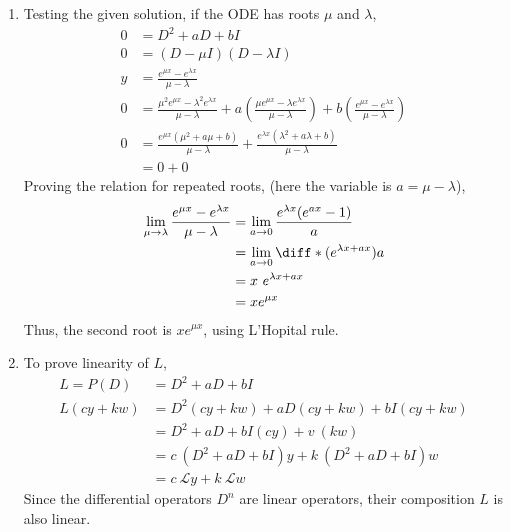 \begin{enumerate}
    \item Testing the given solution, if the ODE has roots $ \mu $ and $ \lambda $,
          \begin{align}
              0 & =   D^{2} + aD + bI                                             \\
              0 & = (D - \mu I)(D - \lambda I )                                   \\
              y & = \frac{e^{\mu x} - e^{\lambda x}}{\mu - \lambda}               \\
              0 & = \frac{\mu ^{2}e^{\mu x} - \lambda ^{2}e^{\lambda x}}
              {\mu - \lambda}
              +  a\left( \frac{\mu e^{\mu x} - \lambda e^{\lambda x}}{\mu - \lambda}
              \right)
              +  b \left( \frac{e^{\mu x} - e^{\lambda x}}{\mu - \lambda} \right) \\
              0 & = \frac{e^{\mu x}(\mu ^{2} + a\mu + b)}{\mu - \lambda}
              + \frac{e^{\lambda x}(\lambda ^{2} + a\lambda + b)}{\mu - \lambda}  \\
                & = 0 + 0
          \end{align}
          Proving the relation for repeated roots, (here the variable is
          $ a = \mu - \lambda$),
          \begin{align}
              \lim_{\mu \to \lambda} \frac{e^{\mu x} - e^{\lambda x}}{\mu - \lambda}
               & =
              \lim_{a \to 0} \frac{e^{\lambda x} (e^{ax} - 1)}{a} \\
               & = \lim_{a \to 0} \diff*{(e^{\lambda x + ax})}{a} \\
               & = x\ e^{\lambda x + ax}                          \\
               & = xe^{\mu x}
          \end{align}
          Thus, the second root is $ xe^{\mu x} $, using L'Hopital rule.

    \item To prove linearity of $ L $,
          \begin{align}
              L = P(D)   & = D^{2} + aD + bI                                \\
              L(cy + kw) & = D^{2}(cy + kw) + aD(cy + kw) + bI(cy + kw)     \\
                         & = D^{2} + aD + bI (cy) + v\ (kw)                 \\
                         & = c\ (D^{2} + aD + bI)y + k\ (D^{2} + aD + bI) w \\
                         & = c\ \mathcal{L}y+k\ \mathcal{L}w
          \end{align}
          Since the differential operators $ D^{n} $ are linear operators, their
          composition $ L $ is also linear.
\end{enumerate}